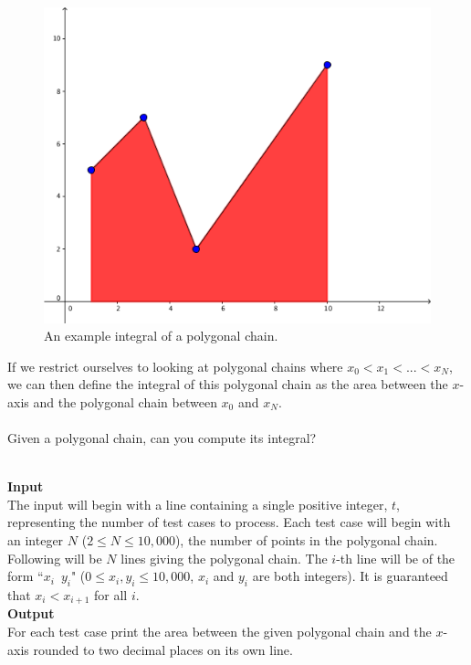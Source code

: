 \documentclass[a4paper,11pt]{article}
\begin{document}
{%
\vspace{-8.37mm}
\begin{figure}[!htb]
    \centering
        \centering
        \includegraphics[width=0.8\linewidth, height=0.25\textheight]{polyintegral.png}
        \caption{An example integral of a polygonal chain.}
\end{figure}
\newpage
\noindent
If we restrict ourselves to looking at polygonal chains where $x_0 < x_1 < ... < x_N$, we can then define the integral of this polygonal chain as the area between the $x$-axis and the polygonal chain between $x_0$ and $x_N$.\\\\
Given a polygonal chain, can you compute its integral?
}
\vspace{7mm}\\
\large{\bf{Input}}\vspace{2mm}\\
The input will begin with a line containing a single positive integer, $t$, representing the number of test cases to process. Each test case will begin with an integer $N$ ($2 \leq N \leq 10,000$), the number of points in the polygonal chain. Following will be $N$ lines giving the polygonal chain. The $i$-th line will be of the form ``$x_i \enspace y_i$" ($0 \leq x_i, y_i \leq 10,000$, $x_i$ and $y_i$ are both integers). It is guaranteed that $x_i < x_{i+1}$ for all $i$.
\vspace{3mm}\\
\large{\bf{Output}}\vspace{2mm}\\
For each test case print the area between the given polygonal chain and the $x$-axis rounded to two decimal places on its own line.
\end{document}
